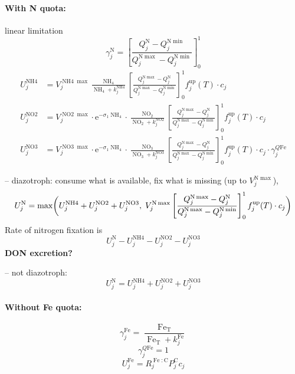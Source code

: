 \documentclass[11pt,letterpaper,english]{article}
\newcommand{\ee}{\mathrm{e}}
\DeclareMathOperator{\Fe}{Fe}
\DeclareMathOperator{\NH}{NH}
\DeclareMathOperator{\NO}{NO}
\DeclareMathOperator{\NHiv}{NH4}
\DeclareMathOperator{\NOii}{NO2}
\DeclareMathOperator{\NOiii}{NO3}
\DeclareMathOperator{\QFe}{\mathit{Q}Fe}
\newcommand{\N}{\mathrm{N}}
\newcommand{\C}{\mathrm{C}}
\newcommand{\total}{{\mathrm{T}}}
\newcommand{\FeT}{\Fe_\total}
\newcommand{\up}{{\text{up}}}
\newcommand{\X}{c}
\begin{document}
\paragraph{With N quota:} linear limitation
\[
  \gamma^\N_j = \left[ \frac{Q^{\N}_j - Q^{\N\min}_j}
                        {Q^{\N\max}_j - Q^{\N\min}_j}
                \right]_0^1
\]
\begin{align*}
  U^{\NHiv}_j &= V^{\NHiv\max}_j
                 \frac{\NH_4}{\NH_4 + k^{\NHiv}_j}
                 \left[ \frac{Q^{\N\max}_j - Q^{\N}_j}
                             {Q^{\N\max}_j - Q^{\N\min}_j}
                 \right]_0^1
                 f^\up_j(T) \cdot \X_j \\
  U^{\NOii}_j &= V^{\NOii\max}_j \cdot
                 \ee^{-\sigma_1 \NH_4} \cdot
                 \frac{\NO_2}{\NO_2 + k^{\NOii}_j}
                 \left[ \frac{Q^{\N\max}_j - Q^{\N}_j}
                             {Q^{\N\max}_j - Q^{\N\min}_j}
                 \right]_0^1
                 f^\up_j(T) \cdot \X_j \\
  U^{\NOiii}_j &= V^{\NOiii\max}_j \cdot
                  \ee^{-\sigma_1 \NH_4} \cdot
                  \frac{\NO_3}{\NO_3 + k^{\NOiii}_j}
                  \left[ \frac{Q^{\N\max}_j - Q^{\N}_j}
                              {Q^{\N\max}_j - Q^{\N\min}_j}
                  \right]_0^1
                  f^\up_j(T) \cdot \X_j
                  \cdot \gamma^{\QFe}_j
\end{align*}

-- diazotroph: consume what is available, fix what is missing (up to $V^{\N\max}_j$),
\[
  U^{\N}_j = \max\biggl( U^{\NHiv}_j + U^{\NOii}_j + U^{\NOiii}_j,\;
                 V^{\N\max}_j
                 \left[ \frac{Q^{\N\max}_j - Q^{\N}_j}
                             {Q^{\N\max}_j - Q^{\N\min}_j}
                 \right]_0^1
                 f^\up_j(T) \cdot \X_j
             \biggr) \\
\]
Rate of nitrogen fixation is
\[
  U^{\N}_j - U^{\NHiv}_j - U^{\NOii}_j - U^{\NOiii}_j
\]
\textbf{DON excretion?}


-- not diazotroph:
\[
  U^{\N}_j = U^{\NHiv}_j + U^{\NOii}_j + U^{\NOiii}_j
\]


\paragraph{Without Fe quota:}
\[
  \gamma^{\Fe}_j = \frac{\FeT}{\FeT + k^{\Fe}_j}
\]
\[
  \gamma^{\QFe}_j = 1
\]
\[
  U^{\Fe}_j = R^{\Fe:\C}_j P^\C_j \X_j
\]
\end{document}
